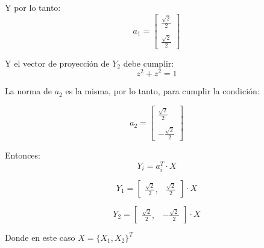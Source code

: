 \documentclass[a4paper,10pt]{article}
\begin{document}
Y por lo tanto:
\begin{equation*}
  a_1 =
  \begin{bmatrix}
    \frac{\sqrt{2}}{2} \\ \\
    \frac{\sqrt{2}}{2}
  \end{bmatrix}
\end{equation*}

Y el vector de proyección de $Y_2$ debe cumplir:
\begin{equation*}
  z^2 + z^2 = 1
\end{equation*}

La norma de $a_2$ es la misma, por lo tanto, para cumplir la condición:

\begin{equation*}
  a_2 =
  \begin{bmatrix}
    \frac{\sqrt{2}}{2} \\ \\
    -\frac{\sqrt{2}}{2}
  \end{bmatrix}
\end{equation*}

Entonces:
\begin{equation*}
Y_i = a_i^T \cdot X
\end{equation*}


\begin{equation*}
Y_1 =
\begin{bmatrix}
\frac{\sqrt{2}}{2}, & \frac{\sqrt{2}}{2}
\end{bmatrix}
\cdot X
\end{equation*}


\begin{equation*}
Y_2 =
\begin{bmatrix}
\frac{\sqrt{2}}{2}, & -\frac{\sqrt{2}}{2}
\end{bmatrix}
\cdot X
\end{equation*}

Donde en este caso $X = \{X_1, X_2\}^T$
\end{document}
